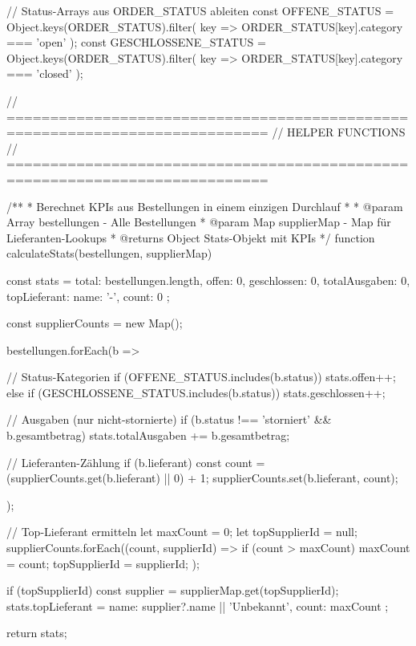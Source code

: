 // Status-Arrays aus ORDER_STATUS ableiten
const OFFENE_STATUS = Object.keys(ORDER_STATUS).filter(
  key => ORDER_STATUS[key].category === 'open'
);
const GESCHLOSSENE_STATUS = Object.keys(ORDER_STATUS).filter(
  key => ORDER_STATUS[key].category === 'closed'
);

// ============================================================================
// HELPER FUNCTIONS
// ============================================================================

/**
 * Berechnet KPIs aus Bestellungen in einem einzigen Durchlauf
 * 
 * @param {Array} bestellungen - Alle Bestellungen
 * @param {Map} supplierMap - Map für Lieferanten-Lookups
 * @returns {Object} Stats-Objekt mit KPIs
 */
function calculateStats(bestellungen, supplierMap) {
  const stats = {
    total: bestellungen.length,
    offen: 0,
    geschlossen: 0,
    totalAusgaben: 0,
    topLieferant: { name: '-', count: 0 }
  };

  const supplierCounts = new Map();

  bestellungen.forEach(b => {
    // Status-Kategorien
    if (OFFENE_STATUS.includes(b.status)) {
      stats.offen++;
    } else if (GESCHLOSSENE_STATUS.includes(b.status)) {
      stats.geschlossen++;
    }

    // Ausgaben (nur nicht-stornierte)
    if (b.status !== 'storniert' && b.gesamtbetrag) {
      stats.totalAusgaben += b.gesamtbetrag;
    }

    // Lieferanten-Zählung
    if (b.lieferant) {
      const count = (supplierCounts.get(b.lieferant) || 0) + 1;
      supplierCounts.set(b.lieferant, count);
    }
  });

  // Top-Lieferant ermitteln
  let maxCount = 0;
  let topSupplierId = null;
  supplierCounts.forEach((count, supplierId) => {
    if (count > maxCount) {
      maxCount = count;
      topSupplierId = supplierId;
    }
  });

  if (topSupplierId) {
    const supplier = supplierMap.get(topSupplierId);
    stats.topLieferant = {
      name: supplier?.name || 'Unbekannt',
      count: maxCount
    };
  }

  return stats;
}

